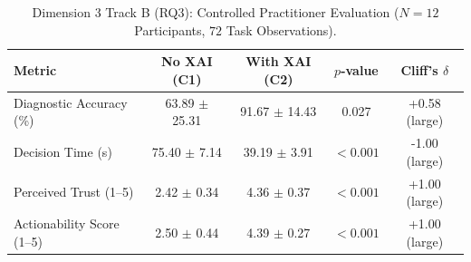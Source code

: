 \begin{table}[t]
\centering
\caption{Dimension 3 Track B (RQ3): Controlled Practitioner Evaluation ($N=12$ Participants, $72$ Task Observations).}
\label{tab:res_d3_practitioner}
\footnotesize
\begin{tabular}{l c c c c}
\toprule
\textbf{Metric} & \textbf{No XAI (C1)} & \textbf{With XAI (C2)} & \textbf{$p$-value} & \textbf{Cliff's $\delta$} \\
\midrule
Diagnostic Accuracy (\%) & 63.89 $\pm$ 25.31 & 91.67 $\pm$ 14.43 & 0.027 & +0.58 (large) \\
Decision Time (s) & 75.40 $\pm$ 7.14 & 39.19 $\pm$ 3.91 & $<0.001$ & -1.00 (large) \\
Perceived Trust (1--5) & 2.42 $\pm$ 0.34 & 4.36 $\pm$ 0.37 & $<0.001$ & +1.00 (large) \\
Actionability Score (1--5) & 2.50 $\pm$ 0.44 & 4.39 $\pm$ 0.27 & $<0.001$ & +1.00 (large) \\
\bottomrule
\end{tabular}
\end{table}